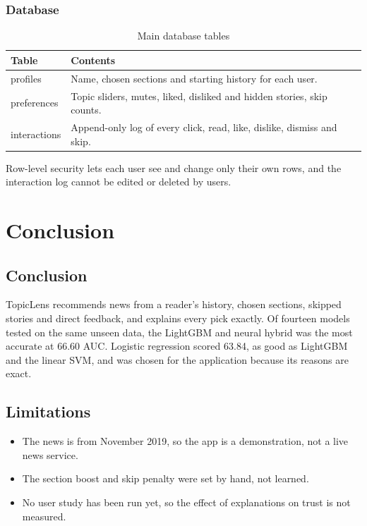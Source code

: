 \documentclass[12pt,a4paper,oneside]{report}
\begin{document}
\subsection{Database}
\begin{table}[H]
\centering
\caption{Main database tables}
\begin{tabularx}{\textwidth}{lL}
\toprule
Table & Contents \\
\midrule
profiles & Name, chosen sections and starting history for each user. \\
preferences & Topic sliders, mutes, liked, disliked and hidden stories, skip counts. \\
interactions & Append-only log of every click, read, like, dislike, dismiss and skip. \\
\bottomrule
\end{tabularx}
\end{table}

Row-level security lets each user see and change only their own rows, and the interaction log cannot be
edited or deleted by users.

\chapter{Conclusion}

\section{Conclusion}
TopicLens recommends news from a reader's history, chosen sections, skipped stories and direct feedback,
and explains every pick exactly. Of fourteen models tested on the same unseen data, the LightGBM and
neural hybrid was the most accurate at 66.60 AUC. Logistic regression scored 63.84, as good as LightGBM
and the linear SVM, and was chosen for the application because its reasons are exact.

\section{Limitations}
\begin{itemize}
  \item The news is from November 2019, so the app is a demonstration, not a live news service.
  \item The section boost and skip penalty were set by hand, not learned.
  \item No user study has been run yet, so the effect of explanations on trust is not measured.
\end{itemize}
\end{document}
